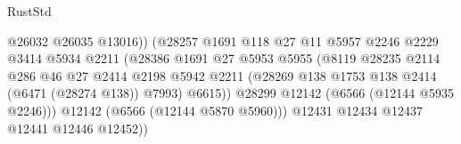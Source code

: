 \begin{lexlean}{RustStd}
\begin{coremodule}
{\begin{coremodule}
{{{{{{{{{{{{{{{{{{{{{{{{{{                                                @26032
                                                @26035
                                                @13016))
                                            (@28257
                                              @1691
                                              @118
                                              @27
                                              @11
                                              @5957
                                              @2246
                                              @2229
                                              @3414
                                              @5934
                                              @2211
                                              (@28386
                                                @1691
                                                @27
                                                @5953
                                                @5955
                                                (@8119
                                                  @28235
                                                  @2114
                                                  @286
                                                  @46
                                                  @27
                                                  @2414
                                                  @2198
                                                  @5942
                                                  @2211
                                                  (@28269
                                                    @138
                                                    @1753
                                                    @138
                                                    @2414
                                                    (@6471 (@28274 @138))
                                                    @7993)
                                                  @6615))
                                              @28299
                                              @12142
                                              (@6566 (@12144 @5935 @2246)))
                                            @12142
                                            (@6566 (@12144 @5870 @5960)))
                                          @12431
                                          @12434
                                          @12437
                                          @12441
                                          @12446
                                          @12452))
}}}}}}}}}}}}}}}}}}}}}}}}}}
\end{coremodule}}
\end{coremodule}
\end{lexlean}
